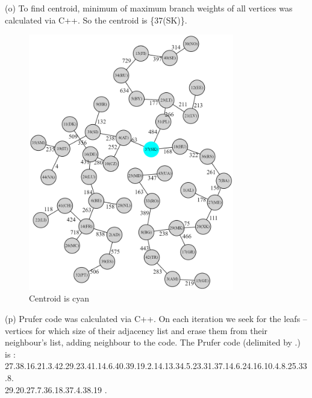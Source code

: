 \documentclass{article}
\begin{document}
	(o) To find centroid, minimum of maximum branch weights of all vertices was calculated via C++. So the centroid is \{37(SK)\}.
	\begin{figure}[h]
		\centering
		\includegraphics[width=0.8\textwidth]{centroid.png}
		\caption{Centroid is cyan}
	\end{figure}\newpage
	(p) Prufer code was calculated via C++. On each iteration we seek for the leafs -- vertices for which size of their adjacency list and erase them from their neighbour's list, adding neighbour to the code. The Prufer code (delimited by .) is :
	27.38.16.21.3.42.29.23.41.14.6.40.39.19.2.14.13.34.5.23.31.37.14.6.24.16.10.4.8.25.33.8.\\29.20.27.7.36.18.37.4.38.19 .
\end{document}
